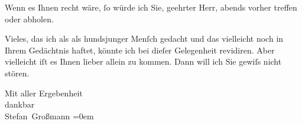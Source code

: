 \pstart
           Wenn es Ihnen recht wäre, ſo würde ich Sie, geehrter Herr, abends vorher treffen oder
               abholen.\pend
           
\pstart
           Vieles, das ich als als hundsjunger Menſch gedacht und das vielleicht noch in Ihrem
                  {\pb}Gedächtnis haftet,
               könnte ich bei dieſer Gelegenheit revidiren. Aber vielleicht iſt es Ihnen lieber
               allein zu kommen. Dann will ich Sie gewiſs nicht stören.\pend
           
\pstart
           Mit aller Ergebenheit{\\[\baselineskip]}dankbar{\\[\baselineskip]}\spacefill\mbox{Stefan Großmann}\pend
           \leftskip=0em{}\endnumbering{}  
      